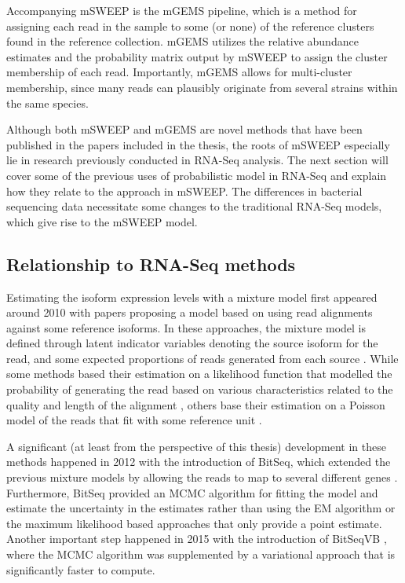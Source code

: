 \documentclass[officiallayout]{tktla}
\begin{document}
Accompanying mSWEEP is the mGEMS pipeline, which is a method for
assigning each read in the sample to some (or none) of the reference
clusters found in the reference collection. mGEMS utilizes the
relative abundance estimates and the probability matrix output by
mSWEEP to assign the cluster membership of each read. Importantly,
mGEMS allows for multi-cluster membership, since many reads can
plausibly originate from several strains within the same species.

Although both mSWEEP and mGEMS are novel methods that have been
published in the papers included in the thesis, the roots of mSWEEP
especially lie in research previously conducted in RNA-Seq
analysis. The next section will cover some of the previous uses of
probabilistic model in RNA-Seq and explain how they relate to the
approach in mSWEEP. The differences in bacterial sequencing data
necessitate some changes to the traditional RNA-Seq models, which give
rise to the mSWEEP model.

\subsection{Relationship to RNA-Seq methods}

Estimating the isoform expression levels with a mixture model first
appeared around 2010 with papers proposing a model based on using read
alignments against some reference isoforms. In these approaches, the
mixture model is defined through latent indicator variables denoting
the source isoform for the read, and some expected proportions of
reads generated from each source \citep{katz2010analysis, li2010rna,
  jiang2009statistical, wang2010isoform}. While some methods based
their estimation on a likelihood function that modelled the
probability of generating the read based on various characteristics
related to the quality and length of the alignment
\citep{katz2010analysis, li2010rna}, others base their estimation on a
Poisson model of the reads that fit with some reference unit
\citep{jiang2009statistical, wang2010isoform}.

A significant (at least from the perspective of this thesis)
development in these methods happened in 2012 with the introduction of
BitSeq, which extended the previous mixture models by allowing the
reads to map to several different genes
\citep{glaus2012identifying}. Furthermore, BitSeq provided an MCMC
algorithm for fitting the model and estimate the uncertainty in the
estimates rather than using the EM algorithm \citep{li2010rna} or the
maximum likelihood \citep{jiang2009statistical} based approaches that
only provide a point estimate. Another important step happened in 2015
with the introduction of BitSeqVB \citep{hensman2015fast}, where the
MCMC algorithm was supplemented by a variational approach that is
significantly faster to compute.
\end{document}
